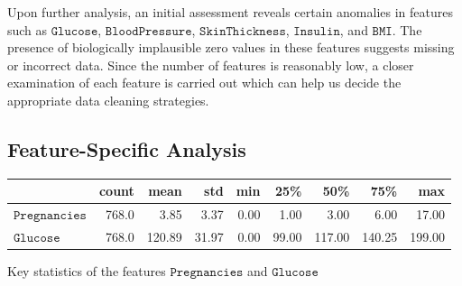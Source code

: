 \documentclass[12pt]{article}
\begin{document}
Upon further analysis, an initial assessment reveals certain anomalies in features such as $\mathtt{Glucose}$, $\mathtt{BloodPressure}$, $\mathtt{SkinThickness}$, $\mathtt{Insulin}$, and $\mathtt{BMI}$. The presence of biologically implausible zero values in these features suggests missing or incorrect data. Since the number of features is reasonably low, a closer examination of each feature is carried out which can help us decide the appropriate data cleaning strategies.


\subsection{Feature-Specific Analysis}

\begin{table}[h]
\begin{center}
    
\begin{tabular}{lrrrrrrrr}
\hline
               & count & mean  & std   & min  & 25\%  & 50\%  & 75\%  & max   \\ \hline
$\mathtt{Pregnancies}$    & 768.0 & 3.85  & 3.37  & 0.00 & 1.00  & 3.00  & 6.00  & 17.00 \\
$\mathtt{Glucose}$        & 768.0 & 120.89& 31.97 & 0.00 & 99.00 & 117.00& 140.25& 199.00\\
\end{tabular}

\vspace{6pt}


Key statistics of the features $\mathtt{Pregnancies}$ and $\mathtt{Glucose}$


\end{center}

\end{table}
\end{document}
